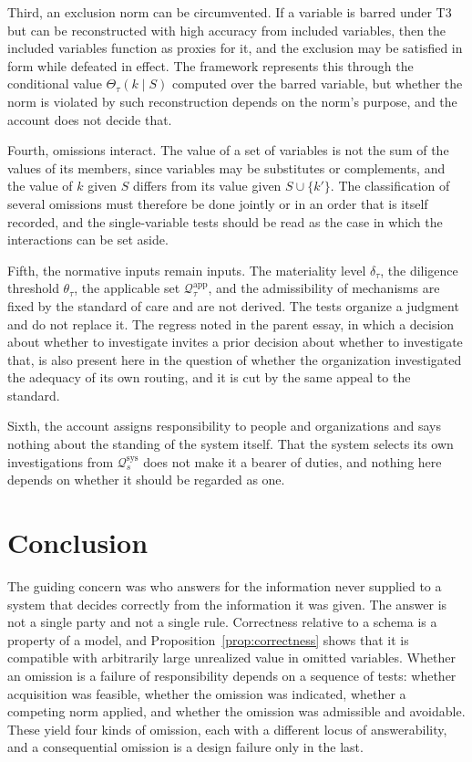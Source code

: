 \documentclass[11pt]{article}
\newcommand{\Q}{\mathcal Q}
\newcommand{\app}{\mathrm{app}}
\newcommand{\Th}{\Theta}
\theoremstyle{plain}
\theoremstyle{definition}
\begin{document}
Third, an exclusion norm can be circumvented. If a variable is barred under T3 but can be reconstructed with high accuracy from included variables, then the included variables function as proxies for it, and the exclusion may be satisfied in form while defeated in effect. The framework represents this through the conditional value $\Th_\tau(k\mid S)$ computed over the barred variable, but whether the norm is violated by such reconstruction depends on the norm's purpose, and the account does not decide that.

Fourth, omissions interact. The value of a set of variables is not the sum of the values of its members, since variables may be substitutes or complements, and the value of $k$ given $S$ differs from its value given $S\cup\{k'\}$. The classification of several omissions must therefore be done jointly or in an order that is itself recorded, and the single-variable tests should be read as the case in which the interactions can be set aside.

Fifth, the normative inputs remain inputs. The materiality level $\delta_\tau$, the diligence threshold $\theta_\tau$, the applicable set $\Q_\tau^{\app}$, and the admissibility of mechanisms are fixed by the standard of care and are not derived. The tests organize a judgment and do not replace it. The regress noted in the parent essay, in which a decision about whether to investigate invites a prior decision about whether to investigate that, is also present here in the question of whether the organization investigated the adequacy of its own routing, and it is cut by the same appeal to the standard.

Sixth, the account assigns responsibility to people and organizations and says nothing about the standing of the system itself. That the system selects its own investigations from $\Q_s^{\mathrm{sys}}$ does not make it a bearer of duties, and nothing here depends on whether it should be regarded as one.

\section{Conclusion}

The guiding concern was who answers for the information never supplied to a system that decides correctly from the information it was given. The answer is not a single party and not a single rule. Correctness relative to a schema is a property of a model, and Proposition~\ref{prop:correctness} shows that it is compatible with arbitrarily large unrealized value in omitted variables. Whether an omission is a failure of responsibility depends on a sequence of tests: whether acquisition was feasible, whether the omission was indicated, whether a competing norm applied, and whether the omission was admissible and avoidable. These yield four kinds of omission, each with a different locus of answerability, and a consequential omission is a design failure only in the last.
\end{document}
